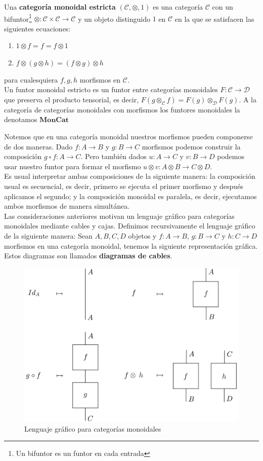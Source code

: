 \documentclass[../main.tex]{subfiles}
\begin{document}
\begin{dfn}
	Una \textbf{categoría monoidal estricta} $(\mathcal{C}, \otimes, 1)$ es una categoría $\mathcal{C}$ con un bifuntor\footnote{Un bifuntor es un funtor en cada entrada} $\otimes : \mathcal{C} \times \mathcal{C} \to \mathcal{C}$ y un objeto distinguido $1$ en $\mathcal{C}$ en la que se satisfacen las siguientes ecuaciones:
	\begin{enumerate}
		\item $1 \otimes f = f = f \otimes 1$
		\item $f \otimes (g \otimes h) = (f \otimes g) \otimes h$
	\end{enumerate} 
	para cualesquiera $f, g, h$ morfismos en $\mathcal{C}$.\\
	Un funtor monoidal estricto es un funtor entre categorías monoidales $F : \mathcal{C} \to \mathcal{D}$ que preserva el producto tensorial, es decir, $F(g \otimes_{\mathcal{C}} f) = F(g) \otimes_{\mathcal{D}} F(g)$. A la categoría de categorías monoidales con morfismos los funtores monoidales la denotamos $\textbf{MonCat}$
\end{dfn}
Notemos que en una categoría monoidal nuestros morfismos pueden componerse de dos maneras. Dado $f:A \to B$ y $g: B \to C$ morfismos podemos construir la composición $g \circ f: A \to C$. Pero también dados $u: A \to C$ y $v: B \to D$ podemos usar nuestro funtor para formar el morfismo $u \otimes v : A \otimes B \to C \otimes D$. \\
Es usual interpretar ambas composiciones de la siguiente manera: la composición usual es secuencial, es decir, primero se ejecuta el primer morfismo y después aplicamos el segundo; y la composición monoidal es paralela, es decir, ejecutamos ambos morfismos de manera simultánea. \\
Las consideraciones anteriores motivan un lenguaje gráfico para categorías monoidales mediante cables y cajas. Definimos recursivamente el lenguaje gráfico de la siguiente manera: Sean $A,B,C,D$ objetos y $f:A \to B$, $g:B \to C$ y $h:C \to D$ morfismos en una categoría monoidal, tenemos la siguiente representación gráfica. Estos diagramas son llamados \textbf{diagramas de cables}.
\begin{figure}[H]
	\includegraphics[scale=2.9]{diagrama/lenguaje.png}
	\centering
	\caption{Lenguaje gráfico para categorías monoidales}
	\label{lenguaje}
\end{figure}
\end{document}
